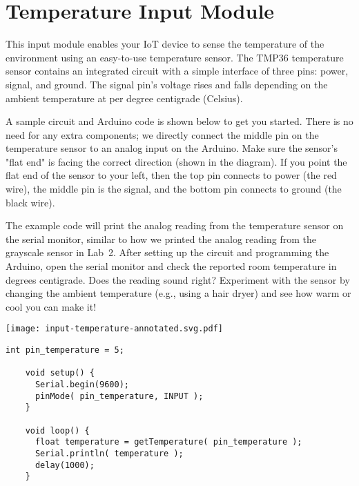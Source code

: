 
\clearpage
\section{Temperature Input Module}
\label{sec-input-temperature}

This input module enables your IoT device to sense the temperature of
the environment using an easy-to-use temperature sensor. The TMP36
temperature sensor contains an integrated circuit with a simple
interface of three pins: power, signal, and ground. The signal pin's
voltage rises and falls depending on the ambient temperature at
 per degree centigrade (Celsius).

A sample circuit and Arduino code is shown below to get you started.
There is no need for any extra components; we directly connect the
middle pin on the temperature sensor to an analog input on the Arduino.
Make sure the sensor's "flat end" is facing the correct direction (shown
in the diagram). If you point the flat end of the sensor to your left,
then the top pin connects to power (the red wire), the middle pin is the
signal, and the bottom pin connects to ground (the black wire).

The example code will print the analog reading from the temperature
sensor on the serial monitor, similar to how we printed the analog
reading from the grayscale sensor in Lab~2. After setting up the circuit
and programming the Arduino, open the serial monitor and check the
reported room temperature in degrees centigrade. Does the reading sound
right? Experiment with the sensor by changing the ambient temperature
(e.g., using a hair dryer) and see how warm or cool you can make it!

\vspace{0.1in}
\begin{minipage}[t]{0.49\tw}
  \vspace{0pt}

  \texttt{[image: input-temperature-annotated.svg.pdf]}
\end{minipage}
\hfill
\begin{minipage}[t]{0.49\tw}
  \vspace{0.1in}
  \begin{Verbatim}[gobble=3,fontsize=\small]
    int pin_temperature = 5;

    void setup() {
      Serial.begin(9600);
      pinMode( pin_temperature, INPUT );
    }

    void loop() {
      float temperature = getTemperature( pin_temperature );
      Serial.println( temperature );
      delay(1000);
    }
  \end{Verbatim}
\end{minipage}
\vspace{0.1in}

